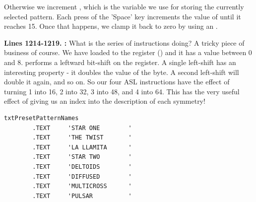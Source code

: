 Otherwise we increment , which is the variable we use for storing the currently selected pattern.
Each press of the 'Space' key increments the value of  until it reaches 15. Once that happens, we 
clamp it back to zero by using an .

\textbf{Lines 1214-1219. :} What is the series of  instructions doing? A tricky
piece of business of course. We have loaded  to the  register () and it has a value between 0 and 8.
 performs a leftward bit-shift on the  register. A single left-shift has an interesting property - it doubles the
value of the byte. A second left-shift will double it again, and so on. So our four {ASL} instructions have the effect of turning 1 into
16, 2 into 32, 3 into 48, and 4 into 64. This has the very useful effect of giving us an index into the description of each symmetry!

\begin{lstlisting}[escapechar=\%]
txtPresetPatternNames
        .TEXT     'STAR ONE        '
        .TEXT     'THE TWIST       '
        .TEXT     'LA LLAMITA      '
        .TEXT     'STAR TWO        '
        .TEXT     'DELTOIDS        '
        .TEXT     'DIFFUSED        '
        .TEXT     'MULTICROSS      '
        .TEXT     'PULSAR          '
\end{lstlisting}

